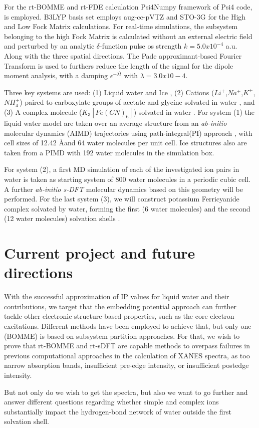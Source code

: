 \documentclass[notitlepage,12pt]{report}
\begin{document}
For the rt-BOMME and rt-FDE calculation Psi4Numpy\supercite{smith2018psi4numpy} framework of Psi4 code\supercite{smith2020psi4}, is employed. B3LYP basis set employs aug-cc-pVTZ and STO-3G for the High and Low Fock Matrix calculations. For real-time simulations, the subsystem belonging to the high Fock Matrix is calculated without an external electric field and perturbed by an analytic $\delta$-function pulse os strength $k=5.0x10^{-4}$ a.u. Along with the three spatial directions. The Pade approximant-based Fourier Transform is used to furthers reduce the length of the signal for the dipole moment analysis, with a damping $\epsilon^{-\lambda \dot{t}}$ with $\lambda=3.0x10-4$. 

Three key systems are used: (1) Liquid water\supercite{gaiduk2018electron} and Ice \supercite{bergmann2007nearest,zhovtobriukh2019x}, (2) Cations ($Li^{+}$,$Na^{+}$,$K^{+}$,$NH_4^{+}$) paired to carboxylate groups of acetate and glycine solvated in water \supercite{aziz2008cation}, and (3) A complex molecule ($K_3[Fe(CN)_6]$) solvated in water \supercite{zheng2018enabling}. For system (1) the liquid water model are taken over an average structure from an \textit{ab-initio} molecular dynamics (AIMD) trajectories using path-integral(PI) approach \supercite{gaiduk2018electron}, with cell sizes of 12.42 \AA and 64 water molecules per unit cell.  Ice structures also are taken from a PIMD with 192 water molecules in the simulation box\supercite{leetmaa2010theoretical}. 

For system (2), a first MD simulation of each of the investigated ion pairs in water is taken as starting system \supercite{aziz2008cation} of 800 water molecules in a periodic cubic cell. A further \textit{ab-initio s-DFT} molecular dynamics\supercite{genova2016avoiding} based on this geometry will be performed.  For the last system (3), we will construct potassium Ferricyanide complex solvated by water, forming the first (6 water molecules) and the second (12 water molecules) solvation shells \supercite{uudsemaa2003density,seidel2011valence}. 

\section{Current project and future directions}

With the successful approximation of IP values for liquid water and their contributions, we target that the embedding potential approach can further tackle other electronic structure-based properties, such as the core electron excitations. Different methods have been employed to achieve that, but only one (BOMME) is based on subsystem partition approaches. For that, we wish to prove that rt-BOMME and rt-sDFT are capable methods to overpass failures in previous computational approaches in the calculation of XANES spectra, as too narrow absorption bands, insufficient pre-edge intensity, or insufficient postedge intensity.

But not only do we wish to get the spectra, but also we want to go further and answer different questions regarding whether simple and complex ions substantially impact the hydrogen-bond network of water outside the first solvation shell. 
\printbibliography
\end{document}
